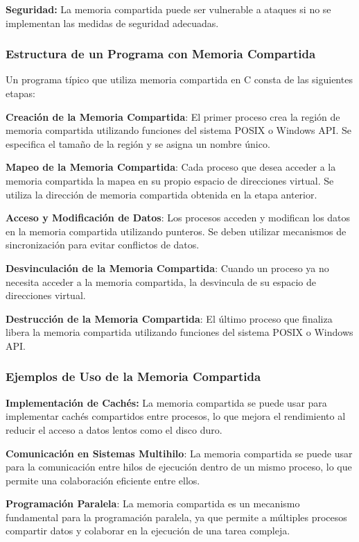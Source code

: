 \textbf{Seguridad:} La memoria compartida puede ser vulnerable a ataques si no se implementan las medidas de seguridad adecuadas.

\subsubsection{Estructura de un Programa con Memoria Compartida}

Un programa típico que utiliza memoria compartida en C consta de las siguientes etapas:

\textbf{Creación de la Memoria Compartida}: El primer proceso crea la región de memoria compartida utilizando funciones del sistema POSIX o Windows API. Se especifica el tamaño de la región y se asigna un nombre único.

\textbf{Mapeo de la Memoria Compartida}: Cada proceso que desea acceder a la memoria compartida la mapea en su propio espacio de direcciones virtual. Se utiliza la dirección de memoria compartida obtenida en la etapa anterior.

\textbf{Acceso y Modificación de Datos}: Los procesos acceden y modifican los datos en la memoria compartida utilizando punteros. Se deben utilizar mecanismos de sincronización para evitar conflictos de datos.

\textbf{Desvinculación de la Memoria Compartida}: Cuando un proceso ya no necesita acceder a la memoria compartida, la desvincula de su espacio de direcciones virtual.

\textbf{Destrucción de la Memoria Compartida}: El último proceso que finaliza libera la memoria compartida utilizando funciones del sistema POSIX o Windows API.

\subsubsection{Ejemplos de Uso de la Memoria Compartida}

\textbf{Implementación de Cachés:} La memoria compartida se puede usar para implementar cachés compartidos entre procesos, lo que mejora el rendimiento al reducir el acceso a datos lentos como el disco duro.

\textbf{Comunicación en Sistemas Multihilo}: La memoria compartida se puede usar para la comunicación entre hilos de ejecución dentro de un mismo proceso, lo que permite una colaboración eficiente entre ellos.

\textbf{Programación Paralela}: La memoria compartida es un mecanismo fundamental para la programación paralela, ya que permite a múltiples procesos compartir datos y colaborar en la ejecución de una tarea compleja.


